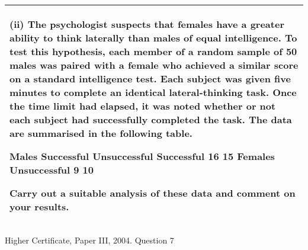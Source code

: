 \documentclass[a4paper,12pt]{article}
\begin{document}
\begin{table}[ht!]
 
\centering
 
\begin{tabular}{|p{15cm}|}
 
\hline  

 (ii) The psychologist suspects that females have a greater ability to think laterally than males of equal intelligence.  To test this hypothesis, each member of a random sample of 50 males was paired with a female who achieved a similar score on a standard intelligence test.  Each subject was given five minutes to complete an identical lateral-thinking task.  Once the time limit had elapsed, it was noted whether or not each subject had successfully completed the task.  The data are summarised in the following table. 
 
  Males   Successful Unsuccessful Successful 16 15 Females Unsuccessful   9 10 
 
Carry out a suitable analysis of these data and comment on your results. 
\\ \hline
  
\end{tabular}

\end{table} 

Higher Certificate, Paper III, 2004.  Question 7 
 
\end{document}

